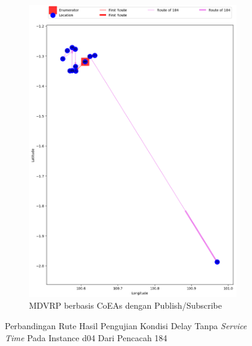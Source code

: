 \begin{figure}[H]\ContinuedFloat
	\centering
	\begin{subfigure}[t]{\textwidth}
		\centering
		\includegraphics[width=\textwidth]{Resources/Images/delayed_4/real_m15_n100_delayed_4_184_pubsub_coes}
		\caption{MDVRP berbasis CoEAs dengan Publish/Subscribe}
		\label{fig:real_m15_n100_delayed_4_184_pubsub_coes}
	\end{subfigure}
	\caption{Perbandingan Rute Hasil Pengujian Kondisi Delay Tanpa \textit{Service Time} Pada Instance d04 Dari Pencacah 184}
	\label{fig:real_m15_n100_delayed_4_184_contd}
\end{figure}


